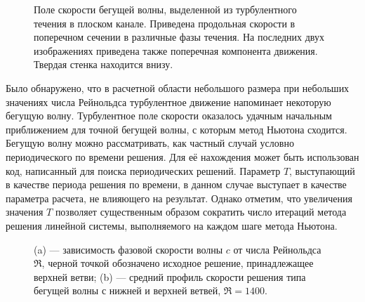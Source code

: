 \begin{figure}
\caption{Поле скорости бегущей волны, выделенной из турбулентного течения в плоском канале. Приведена продольная скорости в поперечном сечении в различные фазы течения. На последних двух изображениях приведена также поперечная компонента движения. Твердая стенка находится внизу.} 
\label{duct_turb_tw_pic}
\end{figure}

Было обнаружено, что в расчетной области небольшого размера при небольших значениях числа Рейнольдса турбулентное движение напоминает некоторую бегущую волну. Турбулентное поле скорости оказалось удачным начальным приближением для точной бегущей волны, с которым метод Ньютона сходится. Бегущую волну можно рассматривать, как частный случай условно периодического по времени решения. Для её нахождения может быть использован код, написанный для поиска периодических решений. Параметр $T$, выступающий в качестве периода решения по времени, в данном случае выступает в качестве параметра расчета, не влияющего на результат. Однако отметим, что увеличения значения $T$ позволяет существенным образом сократить число итераций метода решения линейной системы, выполняемого на каждом шаге метода Ньютона. 


\begin{figure}
\caption{(a) --- зависимость фазовой скорости волны $c$ от числа Рейнольдса $\Re$, черной точкой обозначено исходное решение, принадлежащее верхней ветви; (b) --- средний профиль скорости решения типа бегущей волны с нижней и верхней ветвей, $\Re = 1400$.} 
\label{duct_turb_tw_contin}
\end{figure}


